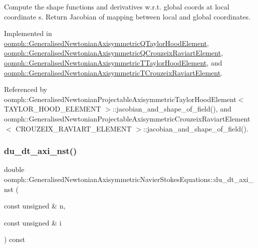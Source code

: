 Compute the shape functions and derivatives w.\+r.\+t. global coords at local coordinate s. Return Jacobian of mapping between local and global coordinates. 



Implemented in \hyperlink{classoomph_1_1GeneralisedNewtonianAxisymmetricQTaylorHoodElement_ab06548cfe44cf1ca0bec7ef66713aef2}{oomph\+::\+Generalised\+Newtonian\+Axisymmetric\+Q\+Taylor\+Hood\+Element}, \hyperlink{classoomph_1_1GeneralisedNewtonianAxisymmetricQCrouzeixRaviartElement_a790d9775c51bfb95506c334f4fc3ec95}{oomph\+::\+Generalised\+Newtonian\+Axisymmetric\+Q\+Crouzeix\+Raviart\+Element}, \hyperlink{classoomph_1_1GeneralisedNewtonianAxisymmetricTTaylorHoodElement_a8df69ffc1f0a57cbac6e11ad35621d67}{oomph\+::\+Generalised\+Newtonian\+Axisymmetric\+T\+Taylor\+Hood\+Element}, and \hyperlink{classoomph_1_1GeneralisedNewtonianAxisymmetricTCrouzeixRaviartElement_a3f7f83676b97ede469c7d2161f9f5705}{oomph\+::\+Generalised\+Newtonian\+Axisymmetric\+T\+Crouzeix\+Raviart\+Element}.



Referenced by oomph\+::\+Generalised\+Newtonian\+Projectable\+Axisymmetric\+Taylor\+Hood\+Element$<$ T\+A\+Y\+L\+O\+R\+\_\+\+H\+O\+O\+D\+\_\+\+E\+L\+E\+M\+E\+N\+T $>$\+::jacobian\+\_\+and\+\_\+shape\+\_\+of\+\_\+field(), and oomph\+::\+Generalised\+Newtonian\+Projectable\+Axisymmetric\+Crouzeix\+Raviart\+Element$<$ C\+R\+O\+U\+Z\+E\+I\+X\+\_\+\+R\+A\+V\+I\+A\+R\+T\+\_\+\+E\+L\+E\+M\+E\+N\+T $>$\+::jacobian\+\_\+and\+\_\+shape\+\_\+of\+\_\+field().

\mbox{\label{classoomph_1_1GeneralisedNewtonianAxisymmetricNavierStokesEquations_a8663a3a510ac181c861b0f303b377e27}} 
\subsubsection{\texorpdfstring{du\+\_\+dt\+\_\+axi\+\_\+nst()}{du\_dt\_axi\_nst()}}
{\footnotesize\ttfamily double oomph\+::\+Generalised\+Newtonian\+Axisymmetric\+Navier\+Stokes\+Equations\+::du\+\_\+dt\+\_\+axi\+\_\+nst (\begin{DoxyParamCaption}\item[{const unsigned \&}]{n,  }\item[{const unsigned \&}]{i }\end{DoxyParamCaption}) const\hspace{0.3cm}{\ttfamily [inline]}}



